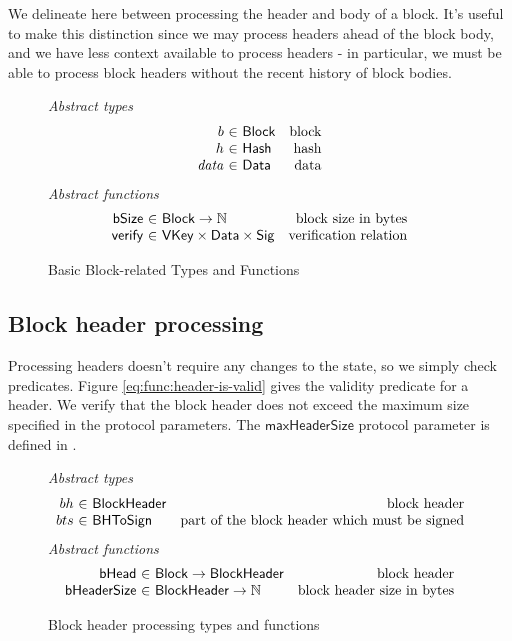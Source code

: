 \documentclass[11pt,a4paper]{article}
\newcommand{\var}[1]{\mathit{#1}}
\newcommand{\fun}[1]{\mathsf{#1}}
\newcommand{\type}[1]{\mathsf{#1}}
\newcommand{\pp}[1]{\mathsf{#1}}
\newcommand{\totalf}{\to}
\newcommand{\Hash}{\type{Hash}}  %
\newcommand{\Block}{\type{Block}}
\newcommand{\VKey}{\type{VKey}}
\newcommand{\Sig}{\type{Sig}}
\newcommand{\Data}{\type{Data}}
\newcommand{\maxheadersize}{\pp{maxHeaderSize}}
\newcommand{\bsizename}{bSize}
\newcommand{\bhdrsizename}{bHeaderSize}
\newcommand{\verifyname}{verify}
\begin{document}
We delineate here between processing the header and body of a block. It's useful
to make this distinction since we may process headers ahead of the
block body, and we have less context available to process headers - in
particular, we must be able to process block headers without the recent history
of block bodies.

\begin{figure}[ht]
  \emph{Abstract types}
  \begin{equation*}
    \begin{array}{r@{~\in~}lr}
      b & \Block & \text{block} \\
      h & \Hash   & \text{hash} \\
      \var{data} & \Data    & \text{data}
    \end{array}
  \end{equation*}
  \emph{Abstract functions}
  \begin{equation*}
    \begin{array}{r@{~\in~}lr}
      \fun{\bsizename} & \Block \totalf \mathbb{N} & \text{block size in bytes} \\
      \fun{\verifyname} & \VKey \times \Data \times \Sig & \text{verification relation} \\
    \end{array}
  \end{equation*}
  \caption{Basic Block-related Types and Functions}
  \label{fig:block-defs}
\end{figure}

\subsection{Block header processing}

Processing headers doesn't require any changes to the state, so we simply check
predicates. Figure \ref{eq:func:header-is-valid} gives the validity
predicate for a header. We verify that the block header does not exceed the
maximum size specified in the protocol parameters. The $\maxheadersize{}$
protocol parameter is defined in \cite{byron_ledger_spec}.

\begin{figure}[ht]
  \emph{Abstract types}
  \begin{equation*}
    \begin{array}{r@{~\in~}lr}
      bh & \Bhead & \text{block header} \\
      bts & \Bhtosign & \text{part of the block header which must be signed}
    \end{array}
  \end{equation*}
  \emph{Abstract functions}
  \begin{equation*}
    \begin{array}{r@{~\in~}lr}
      \fun{\bheadname} & \Block \totalf \Bhead & \text{block header} \\
      \fun{\bhdrsizename} & \Bhead \totalf \mathbb{N} & \text{block header size in bytes}
    \end{array}
  \end{equation*}
  \caption{Block header processing types and functions}
  \label{fig:defs:bhead}
\end{figure}
\end{document}
